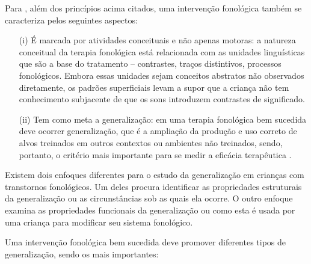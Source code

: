 \documentclass[output=paper,colorlinks,citecolor=brown,booklanguage=portuguese]{langscibook}
\begin{document}
Para \citet{StoelGammon1985}, além dos princípios acima citados, uma intervenção fonológica também se caracteriza pelos seguintes aspectos:

\begin{itemize}
\item[(i)] É marcada por atividades conceituais e não apenas motoras: a natureza conceitual da terapia fonológica está relacionada com as unidades linguísticas que são a base do tratamento – contrastes, traços distintivos, processos fonológicos. Embora essas unidades sejam conceitos abstratos não observados diretamente, os padrões superficiais levam a supor que a criança não tem conhecimento subjacente de que os sons introduzem contrastes de significado.

\item[(ii)] Tem como meta a generalização: em uma terapia fonológica bem sucedida deve ocorrer generalização, que é a ampliação da produção e uso correto de alvos treinados em outros contextos ou ambientes não treinados, sendo, portanto, o critério mais importante para se medir a eficácia terapêutica \citep{Elbert1986}.
\end{itemize}

Existem dois enfoques diferentes para o estudo da generalização em crianças com transtornos fonológicos. Um deles procura identificar as propriedades estruturais da generalização ou as circunstâncias sob as quais ela ocorre. O outro enfoque examina as propriedades funcionais da generalização ou como esta é usada por uma criança para modificar seu sistema fonológico.

Uma intervenção fonológica bem sucedida deve promover diferentes tipos de generalização, sendo os mais importantes:
\end{document}
